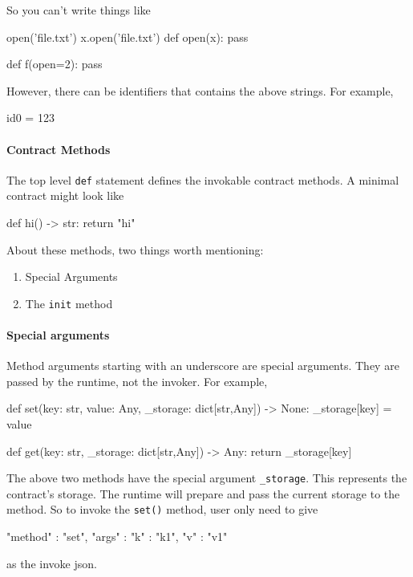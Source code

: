 \documentclass[dvipsnames]{article}
\begin{document}
So you can't write things like
\begin{simplepy}
open('file.txt')
x.open('file.txt')
def open(x):
    pass

def f(open=2):
    pass
\end{simplepy}

However, there can be identifiers that contains the above strings. For example,
\begin{simplepy}
id0 = 123
\end{simplepy}

\paragraph{Contract Methods}

The top level \texttt{def} statement defines the invokable contract methods. A
minimal contract might look like
\begin{simplepy}
def hi() -> str:
    return "hi"
\end{simplepy}

About these methods, two things worth mentioning:
\begin{enumerate}
\item Special Arguments
\item The \texttt{init} method
\end{enumerate}

\paragraph{Special arguments}

Method arguments starting with an underscore are special arguments. They are
passed by the runtime, not the invoker. For example,
\begin{simplepy}
def set(key: str, value: Any, _storage: dict[str,Any]) -> None:
    _storage[key] = value

def get(key: str, _storage: dict[str,Any]) -> Any:
    return _storage[key]
\end{simplepy}

The above two methods have the special argument \texttt{\_storage}. This
represents the contract's storage. The runtime will prepare and pass the current
storage to the method. So to invoke the \texttt{set()} method, user only need to
give
\begin{simplejs}
{
    "method" : "set",
    "args" : {
        "k" : "k1",
        "v" : "v1"
    }
}
\end{simplejs}
as the invoke json.
\end{document}
